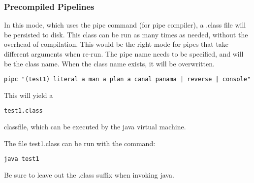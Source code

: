 \subsubsection{Precompiled Pipelines}
In this mode, which uses the pipc command (for pipe compiler), a .class file will be persisted to disk. This class can be run as many times as needed, without the overhead of compilation. This would be the right mode for pipes that take different arguments when re-run.
The pipe name needs to be specified, and will be the class name. When
the class name exists, it will be overwritten.
\begin{lstlisting}
pipc "(test1) literal a man a plan a canal panama | reverse | console"
\end{lstlisting}
This will yield a \begin{alltt}test1.class\end{alltt} classfile, which
can be executed by the java virtual machine.

The file test1.class can be run with the command:
\begin{verbatim}
java test1
\end{verbatim}
Be sure to leave out the .class suffix when invoking java.
